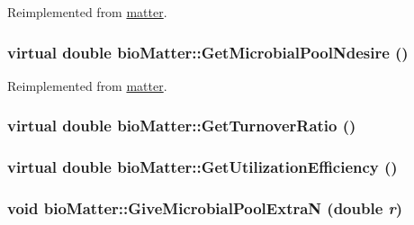 Reimplemented from \hyperlink{classmatter_addcaacf93fd6c24eceada787a2bac3fe}{matter}.\hypertarget{classbio_matter_ab581ae32f84e6396b6c1057f70989333}{
\subsubsection[{GetMicrobialPoolNdesire}]{\setlength{\rightskip}{0pt plus 5cm}virtual double bioMatter::GetMicrobialPoolNdesire ()}}
\label{classbio_matter_ab581ae32f84e6396b6c1057f70989333}


Reimplemented from \hyperlink{classmatter_a1af8fc74ce3aed8d761a4a3cd0b98ca0}{matter}.\hypertarget{classbio_matter_ab2f5c9de1f2d2e7df6a98a51459a2175}{
\subsubsection[{GetTurnoverRatio}]{\setlength{\rightskip}{0pt plus 5cm}virtual double bioMatter::GetTurnoverRatio ()}}
\label{classbio_matter_ab2f5c9de1f2d2e7df6a98a51459a2175}
\hypertarget{classbio_matter_a47e39d55d2b9b4ad92a9f82fc7ad4cf7}{
\subsubsection[{GetUtilizationEfficiency}]{\setlength{\rightskip}{0pt plus 5cm}virtual double bioMatter::GetUtilizationEfficiency ()}}
\label{classbio_matter_a47e39d55d2b9b4ad92a9f82fc7ad4cf7}
\hypertarget{classbio_matter_aa3c39ebe46dac6e354b127c53bf94cb3}{
\subsubsection[{GiveMicrobialPoolExtraN}]{\setlength{\rightskip}{0pt plus 5cm}void bioMatter::GiveMicrobialPoolExtraN (double {\em r})}}
\label{classbio_matter_aa3c39ebe46dac6e354b127c53bf94cb3}


